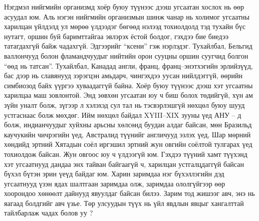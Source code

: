 Нэгдмэл нийгмийн организмд хоёр буюу түүнээс дээш угсаатан хослох нь өөр асуудал юм. Аль нэгэн нийгмийн организмын шинж чанар нь холимог угсаатны харилцан үйлдэлд ул мөрөө үлдээдэг бөгөөд нэлээд тохиолдолд тэд тухайн бүс нутагт, оршин буй баримттайгаа эвлэрэх ёстой болдог, гэхдээ бие биедээ татагдахгүй байж чадахгүй. Эдгээрийг “ксени” гэж нэрлэдэг. Тухайлбал, Бельгид валлончууд болон фламандчуудыг нийтийн орон сууцны оршин суугчид болгон “өөд нь татсан”. Тухайлбал, Канадад англи, франц, франц–энэтхэгийн эрлийзүүд, бас дээр нь славянууд зэрэгцэн амьдарч, чингэхдээ уусан нийлдэггүй, өөрийн симбиозод байх үүргээ хуваадаггүй байна.
Хоёр буюу түүнээс дээш хэт угсаатны харилцаа маш зовлонтой. Энд зөвхөн угсаатан юу ч биш болох төдийгүй, хүн ам зүйн уналт болж, зүгээр л хэлэхэд сул тал нь тэсвэрлэшгүй нөхцөл буюу шууд устгаснаас болж мөхдөг. Ийм нөхцөл байдал XYIII–XIX зууны үед АНУ – д болж, индианчуудыг хуйхны арьсны хөлсөнд буудан алдаг байсан, мөн Бразильд каучукийн чичрэгийн үед, Австралид түүнийг англичууд эзлэх үед, Шар мөрний хөндийд эртний Хятадын соёл иргэшил эртний жун овгийн соёлтой тулгарах үед тохиолдож байсан. Жун овгоос юу ч үлдээгүй юм.
Гэхдээ түүний хамт түүхэнд хэт угсаатнууд дандаа энх тайван байгаагүй ч, харилцан устгалцдаггүй байсан бүхэл бүтэн эрин үеүд байдаг юм. Харин заримдаа нэг бүхэллэгийн дэд угсаатнууд үзэн ядах шалтгаан заримдаа олж, заримдаа ололгүйгээр өөр хоорондоо хөнөөлт дайнууд явуулдаг байсан билээ. Зарим тод жишээг авч, энэ нь яагаад болдгийг авч үзье. Төр улсуудын түүх нь үйл явдлын явцыг хангалттай тайлбарлаж чадах болов уу ?
